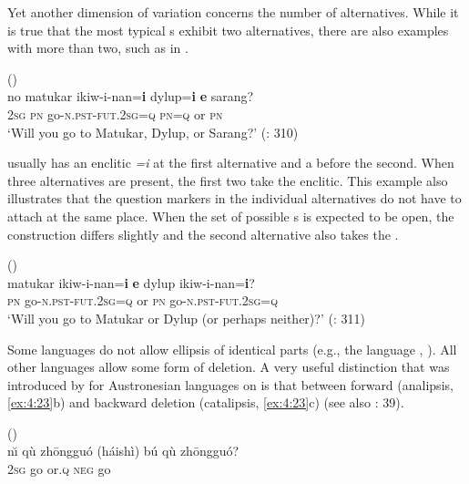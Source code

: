 Yet another dimension of variation concerns the number of alternatives. While it is true that the most typical s exhibit two alternatives, there are also examples with more than two, such as in .

\ea%
    \label{ex:4:21}
     ()\\
    \gll no matukar ikiw-i-nan=\textbf{{i}} dylup=\textbf{{i}} \textbf{{e}} sarang?\\
    2\textsc{sg}  \textsc{pn}    go-\textsc{n.pst}-\textsc{fut}.2\textsc{sg}=\textsc{q}  \textsc{pn}=\textsc{q}    or  \textsc{pn}\\
    \glt ‘Will you go to Matukar, Dylup, or Sarang?’ (\citealt{Berghäll2015}: 310)
    \z

\noindent {} usually has an enclitic \textit{=i} at the first alternative and a  before the second. When three alternatives are present, the first two take the enclitic. This example also illustrates that the question markers in the individual alternatives do not have to attach at the same place. When the set of possible s is expected to be open, the construction differs slightly and the second alternative also takes the  .

\ea%
    \label{ex:4:22}
     ()\\
    \gll matukar ikiw-i-nan=\textbf{i} \textbf{e} dylup ikiw-i-nan=\textbf{i}?\\
    \textsc{pn}    go-\textsc{n.pst}-\textsc{fut}.2\textsc{sg}=\textsc{q}  or  \textsc{pn}  go-\textsc{n.pst}-\textsc{fut}.2\textsc{sg}=\textsc{q}\\
    \glt ‘Will you go to Matukar or Dylup (or perhaps neither)?’ (\citealt{Berghäll2015}: 311)
    \z

Some languages do not allow ellipsis of identical parts (e.g., the  language , \citealt{Zeitoun2007}). All other languages allow some form of deletion. A very useful distinction that was introduced by \citet{Huang1999} for Austronesian languages on  is that between forward (analipsis, \ref{ex:4:23}b) and backward deletion (catalipsis, \ref{ex:4:23}c) (see also \citealt{Haspelmath2007}: 39).

\ea%
    \label{ex:4:23}
     ()\\
    \ea
    \gll n\u{\i}  qù  zh\=ongguó  (háishì)  bú   qù  zh\=ongguó?\\
    2\textsc{sg}  go      or.\textsc{q}    \textsc{neg}  go  \\

